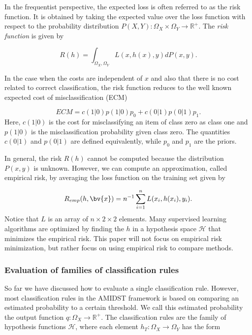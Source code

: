 In the frequentist perspective, the expected loss is often referred to as the risk function.  It is obtained by taking the expected value over the loss function with respect to the probability distribution $P(X,Y): \Omega_X\times \Omega_Y \rightarrow \mathbb{R}^+$.  The \emph{risk function} is given by

\begin{equation}
\label{def:risk}
R(h) = \int_{\Omega_X,\Omega_Y} L(x,h(x),y) dP(x,y).
\end{equation}

In the case when the costs are independent of $x$ and also that there is no cost related to correct classification, the risk function reduces to the well known expected cost of misclassification (ECM)

\begin{equation}
\label{eq:ecm}
ECM =  c(1|0)p(1|0)p_0  + c(0|1)p(0|1)p_1.
\end{equation}
Here, $c(1|0)$ is the cost for misclassifying an item of class zero as class one and $p(1|0)$ is the misclassification probability given class zero.  The quantities $c(0|1)$ and $p(0|1)$ are defined equivalently, while $p_0$ and $p_1$ are the priors.  

In general, the risk $R(h)$ cannot be computed because the distribution $P(x, y)$ is unknown.  However, we can compute an approximation, called empirical risk, by averaging the loss function on the training set given by 

\begin{equation}
\label{def:empRisk}
R_{emp}(h, \bv{x}) = n^{-1} \sum_{i=1}^n L(x_i, h(x_i), y_i).
\end{equation}
Notice that $L$ is an array of $n \times 2\times 2$ elements.  Many supervised learning algorithms are optimized by finding the $h$ in a hypothesis space $\mathcal{H}$ that minimizes the empirical risk.  This paper will not focus on empirical risk minimization, but rather focus on using empirical risk to compare methods.


\subsubsection{Evaluation of families of classification rules}
\label{sec:hypothesisSpace}

So far we have discussed how to evaluate a single classification rule.  However, most classification rules in the AMIDST framework is based on comparing an estimated probability to a certain threshold.  We call this estimated probability the output function $q: \Omega_X \rightarrow \mathbb{R}^+$.  The classification rules are the family of hypothesis functions $\mathcal{H}$, where each element $h_T:\Omega_X \rightarrow \Omega_Y$ has the form 

